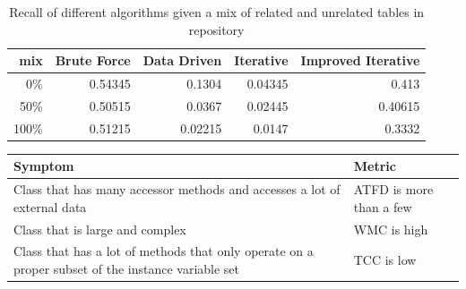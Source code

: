 \begin{table}[h!]
    \centering
    \scriptsize
    \begin{center}
      \caption{Recall of different algorithms given a mix of related and unrelated tables in repository}
      \label{tab:Recall-of-different-algorithms-given-a-mix-of-related-and-unrelated-tables-in-repository}
      \begin{tabular}{|r|r|r|r|r|}
        \hline
        \textbf{mix} & \textbf{Brute Force} & \textbf{Data Driven} & \textbf{Iterative} & \textbf{Improved Iterative} \\
        \hline
        0\% & 0.54345 & 0.1304 & 0.04345 & 0.413 \\
        \hline
        50\% & 0.50515 & 0.0367 & 0.02445 & 0.40615 \\
        \hline
        100\% & 0.51215 & 0.02215 & 0.0147 & 0.3332 \\
        \hline        
      \end{tabular}
    \end{center}
\end{table}







\begin{table}[htb]
\end{table}

\begin{tabularx}{\textwidth}{X|l}
    \textbf{Symptom} & \textbf{Metric} \\
  \hline
  Class that has many accessor methods and accesses a lot of external data & ATFD is more than a few\\
  Class that is large and complex & WMC is high\\
  Class that has a lot of methods that only operate on a proper subset of the instance variable set & TCC is low\\
\end{tabularx}

